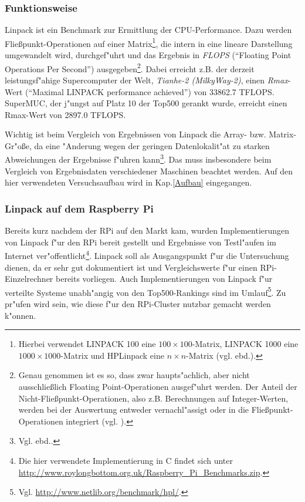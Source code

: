 
\subsubsection{Funktionsweise}\label{Funktionsweise Linpack}

Linpack ist ein Benchmark zur Ermittlung der CPU-Performance. Dazu werden Flie\ss punkt-Operationen auf einer Matrix\footnote{Hierbei verwendet LINPACK 100 eine $100 \times 100$-Matrix, LINPACK 1000 eine $1000\times 1000$-Matrix und HPLinpack eine $n\times n$-Matrix (vgl. ebd.).}, die intern in eine lineare Darstellung umgewandelt wird, durchgef"uhrt und das Ergebnis in \textit{FLOPS} ("`Floating Point Operations Per Second"') ausgegeben\footnote{Genau genommen ist es so, dass zwar haupts"achlich, aber nicht ausschlie\ss lich Floating Point-Operationen ausgef"uhrt werden. Der Anteil der Nicht-Flie\ss punkt-Operationen, also z.B. Berechnungen auf Integer-Werten, werden bei der Auswertung entweder vernachl"assigt oder in die Flie\ss punkt-Operationen integriert (vgl. \cite{wei90}).}. Dabei erreicht z.B. der derzeit leistungsf"ahige Supercomputer der Welt, \textit{Tianhe-2 (MilkyWay-2)}, einen \textit{Rmax}-Wert ("`Maximal LINPACK performance achieved"') von 33862.7 TFLOPS. SuperMUC, der j"ungst auf Platz 10 der Top500 gerankt wurde, erreicht einen Rmax-Wert von 2897.0 TFLOPS.

Wichtig ist beim Vergleich von Ergebnissen von Linpack die Array- bzw. Matrix-Gr"o\ss e, da eine "Anderung wegen der geringen Datenlokalit"at zu starken Abweichungen der Ergebnisse f"uhren kann\footnote{Vgl. ebd..}. Das muss insbesondere beim Vergleich von Ergebnisdaten verschiedener Maschinen beachtet werden. Auf den hier verwendeten Versuchsaufbau wird in Kap.\ref{Aufbau} eingegangen.   

\subsubsection{Linpack auf dem Raspberry Pi}\label{Linpack RPi}

Bereits kurz nachdem der RPi auf den Markt kam, wurden Implementierungen von Linpack f"ur den RPi bereit gestellt und Ergebnisse von Testl"aufen im Internet ver"offentlicht\footnote{Die hier verwendete Implementierung in C findet sich unter \url{http://www.roylongbottom.org.uk/Raspberry_Pi_Benchmarks.zip}.}. Linpack soll als Ausgangspunkt f"ur die Untersuchung dienen, da er sehr gut dokumentiert ist und Vergleichswerte f"ur einen RPi-Einzelrechner bereits vorliegen. Auch Implementierungen von Linpack f"ur verteilte Systeme unabh"angig von den Top500-Rankings sind im Umlauf\footnote{Vgl. \url{http://www.netlib.org/benchmark/hpl/}.}. Zu pr"ufen wird sein, wie diese f"ur den RPi-Cluster nutzbar gemacht werden k"onnen. 

